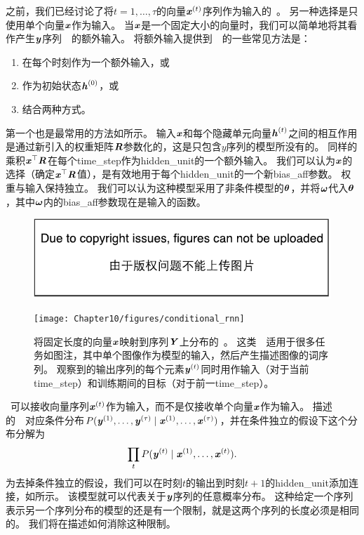 
之前，我们已经讨论了将$t =1, \dots, \tau$的向量$\boldsymbol{\mathit{x}}^{(t)}$序列作为输入的~。
另一种选择是只使用单个向量$\boldsymbol{\mathit{x}}$作为输入。
当$\boldsymbol{\mathit{x}}$是一个固定大小的向量时，我们可以简单地将其看作产生$\boldsymbol{\mathit{y}}$序列~~的额外输入。
将额外输入提供到~~的一些常见方法是：
\begin{enumerate}
 \item 在每个时刻作为一个额外输入，或
 \item 作为初始状态$\boldsymbol{\mathit{h}}^{(0)}$，或
 \item 结合两种方式。
\end{enumerate}

第一个也是最常用的方法如所示。
输入$\boldsymbol{\mathit{x}}$和每个隐藏单元向量$\boldsymbol{\mathit{h}}^{(t)}$之间的相互作用是通过新引入的权重矩阵$\boldsymbol{\mathit{R}}$参数化的，这是只包含$y$序列的模型所没有的。
同样的乘积$\boldsymbol{\mathit{x}}^\top\boldsymbol{\mathit{R}}$在每个\gls{time_step}作为\gls{hidden_unit}的一个额外输入。
我们可以认为$\boldsymbol{\mathit{x}}$的选择（确定$\boldsymbol{\mathit{x}}^\top\boldsymbol{\mathit{R}}$值），是有效地用于每个\gls{hidden_unit}的一个新\gls{bias_aff}参数。
权重与输入保持独立。
我们可以认为这种模型采用了非条件模型的$\boldsymbol{\theta}$，并将$\boldsymbol{\omega}$代入$\boldsymbol{\theta}$，其中$\boldsymbol{\omega}$内的\gls{bias_aff}参数现在是输入的函数。

\begin{figure}[!htb]
\ifOpenSource
\centerline{\includegraphics{figure.pdf}}
\else
\centerline{\texttt{[image: Chapter10/figures/conditional\_rnn]}}
\fi
\caption{将固定长度的向量$\boldsymbol{\mathit{x}}$映射到序列$\boldsymbol{\mathit{Y}}$上分布的~。
这类~~适用于很多任务如图注，其中单个图像作为模型的输入，然后产生描述图像的词序列。
观察到的输出序列的每个元素$\boldsymbol{\mathit{y}}^{(t)}$同时用作输入（对于当前\gls{time_step}）和训练期间的目标（对于前一\gls{time_step}）。
}
\label{fig:chap10_conditional_rnn}
\end{figure}


~可以接收向量序列$\boldsymbol{\mathit{x}}^{(t)}$作为输入，而不是仅接收单个向量$\boldsymbol{\mathit{x}}$作为输入。
描述的~~对应条件分布$P(\boldsymbol{\mathit{y}}^{(1)}, \dots, \boldsymbol{\mathit{y}}^{(\tau)} \mid \boldsymbol{\mathit{x}}^{(1)}, \dots, \boldsymbol{\mathit{x}}^{(\tau)})$，并在条件独立的假设下这个分布分解为
\begin{align}
 \prod_t P(\boldsymbol{\mathit{y}}^{(t)} \mid \boldsymbol{\mathit{x}}^{(1)}, \dots, \boldsymbol{\mathit{x}}^{(t)}).
\end{align}
为去掉条件独立的假设，我们可以在时刻$t$的输出到时刻$t+1$的\gls{hidden_unit}添加连接，如所示。
该模型就可以代表关于$\boldsymbol{\mathit{y}}$序列的任意概率分布。
这种给定一个序列表示另一个序列分布的模型的还是有一个限制，就是这两个序列的长度必须是相同的。
我们将在描述如何消除这种限制。

